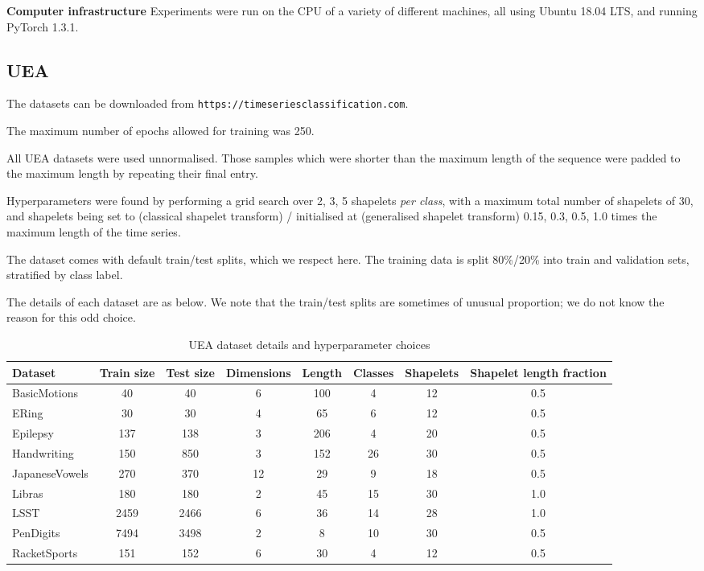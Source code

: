 \documentclass{article}
\theoremstyle{plain}
\theoremstyle{definition}
\newcommand{\boldheading}[1]{

\textbf{#1}\quad}
\begin{document}
	\boldheading{Computer infrastructure} Experiments were run on the CPU of a variety of different machines, all using Ubuntu 18.04 LTS, and running PyTorch 1.3.1.
	
	\subsection{UEA} \label{apx:uea}
	The datasets can be downloaded from \texttt{https://timeseriesclassification.com}.

	The maximum number of epochs allowed for training was 250.	

	All UEA datasets were used unnormalised. Those samples which were shorter than the maximum length of the sequence were padded to the maximum length by repeating their final entry.
	
	Hyperparameters were found by performing a grid search over 2, 3, 5 shapelets \emph{per class}, with a maximum total number of shapelets of 30, and shapelets being set to (classical shapelet transform) / initialised at (generalised shapelet transform) 0.15, 0.3, 0.5, 1.0 times the maximum length of the time series.
	
	The dataset comes with default train/test splits, which we respect here. The training data is split 80\%/20\% into train and validation sets, stratified by class label.
	
	The details of each dataset are as below. We note that the train/test splits are sometimes of unusual proportion; we do not know the reason for this odd choice.

	\begin{table}[ht]
		\caption{UEA dataset details and hyperparameter choices}
		\label{tab:uea_hyperparams_old}
		\centering
		\begin{tabular}{lccccccc}
			\toprule
			Dataset & Train size & Test size & Dimensions & Length & Classes & \parbox{10mm}{Shapelets} & \parbox{10mm}{Shapelet length fraction} \\ \midrule
			BasicMotions    & 40 & 40 & 6 & 100 & 4 & 12 & 0.5 \\
			ERing           & 30 & 30 & 4 & 65 & 6 & 12 & 0.5 \\
			Epilepsy        & 137 & 138 & 3 & 206 & 4 & 20 & 0.5 \\
			Handwriting     & 150 & 850 & 3 & 152 & 26 & 30 & 0.5 \\
			JapaneseVowels  & 270 & 370 & 12 & 29 & 9 & 18 & 0.5 \\
			Libras          & 180 & 180 & 2 & 45 & 15 & 30 & 1.0 \\
			LSST            & 2459 & 2466 & 6 & 36 & 14 & 28 & 1.0 \\
			PenDigits       & 7494 & 3498 & 2 & 8 & 10 & 30 & 0.5 \\
			RacketSports    & 151 & 152 & 6 & 30 & 4 & 12 & 0.5 \\
			\bottomrule
		\end{tabular}
	\end{table}
	
\end{document}
